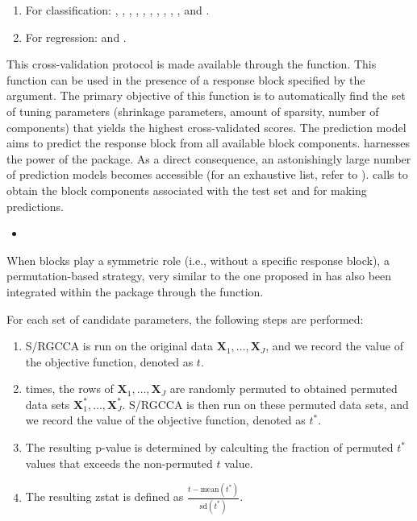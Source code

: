 \documentclass[
]{jss}
\begin{document}
\begin{enumerate}
\item For classification: , , , , , , , , , , and . 

\item For regression:  and .
\end{enumerate}

This cross-validation protocol is made available through the
 function. This function can be used in the presence
of a response block specified by the  argument. The
primary objective of this function is to automatically find the set of
tuning parameters (shrinkage parameters, amount of sparsity, number of
components) that yields the highest cross-validated scores. The
prediction model aims to predict the response block from all available
block components.  harnesses the power of the
 package. As a direct consequence, an astonishingly large
number of prediction models becomes accessible (for an exhaustive list,
refer to ).  calls
 to obtain the block components associated with
the test set and  for making predictions.

\begin{itemize}
\item
\end{itemize}

When blocks play a symmetric role (i.e., without a specific response
block), a permutation-based strategy, very similar to the one proposed
in \cite{Witten2009a} has also been integrated within the 
package through the  function.

For each set of candidate parameters, the following steps are performed:

\begin{enumerate}
\item S/RGCCA is run on the original data 
$\mathbf X_1, \ldots, \mathbf X_J$, and we record the value of the objective 
function, denoted as $t$.
\item {} times, the rows of $\mathbf X_1, \ldots, \mathbf X_J$ are
randomly permuted to obtained permuted data sets $\mathbf X_1^*, \ldots, \mathbf X_J^*$.
S/RGCCA is then run on these permuted data sets, and we record the value of the objective
function, denoted as $t^*$.
\item The resulting p-value is determined by calculting the fraction of permuted $t^*$ values that exceeds the non-permuted $t$ value.
\item The resulting zstat is defined as $\frac{t-\text{mean}(t^*)}{\text{sd}(t^*)}$.
\end{enumerate}
\end{document}
